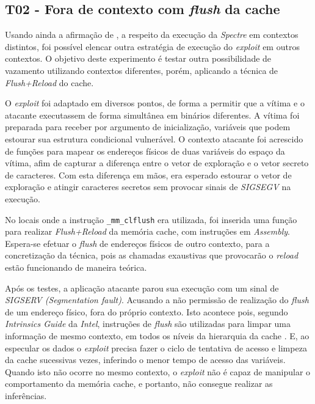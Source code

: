 \documentclass[
	article,			    %
	12pt,				    %
	oneside,			    %
	a4paper,			    %
	chapter=TITLE,		    %
	section=TITLE,		    %
	subsection=TITLE,	    %
	english,			    %
	brazil,				    %
	sumario=tradicional
]{abntex2}
\begin{document}
\subsection{T02 - Fora de contexto com \emph{flush} da cache}
Usando ainda a afirmação de , a respeito da execução da \emph{Spectre} em contextos distintos, foi possível elencar outra estratégia de execução do \emph{exploit} em outros contextos. O objetivo deste experimento é testar outra possibilidade de vazamento utilizando contextos diferentes, porém, aplicando a técnica de \emph{Flush+Reload} do cache.

O \emph{exploit} foi adaptado em diversos pontos, de forma a permitir que a vítima e o atacante executassem de forma simultânea em binários diferentes. A vítima foi preparada para receber por argumento de inicialização, variáveis que podem estourar sua estrutura condicional vulnerável. O contexto atacante foi acrescido de funções para mapear os endereços físicos de duas variáveis do espaço da vítima, afim de capturar a diferença entre o vetor de exploração e o vetor secreto de caracteres. Com esta diferença em mãos, era esperado estourar o vetor de exploração e atingir caracteres secretos sem provocar sinais de \emph{SIGSEGV} na execução.

No locais onde a instrução \lstinline[language=C, style=c]{_mm_clflush} era utilizada, foi inserida uma função para realizar \emph{Flush+Reload} da memória cache, com instruções em \emph{Assembly}. Espera-se efetuar o \emph{flush} de endereços físicos de outro contexto, para a concretização da técnica, pois as chamadas exaustivas que provocarão o \emph{reload} estão funcionando de maneira teórica.

Após os testes, a aplicação atacante parou sua execução com um sinal de \emph{SIGSERV (Segmentation fault)}. Acusando a não permissão de realização do \emph{flush} de um endereço físico, fora do próprio contexto. Isto acontece pois, segundo \emph{Intrinsics Guide} da \emph{Intel}, instruções de \emph{flush} são utilizadas para limpar uma informação de mesmo contexto, em todos os níveis da hierarquia da cache \cite{Intel2018Intrinsics}. E, ao especular os dados o \emph{exploit} precisa fazer o ciclo de tentativa de acesso e limpeza da cache sucessivas vezes, inferindo o menor tempo de acesso das variáveis. Quando isto não ocorre no mesmo contexto, o \emph{exploit} não é capaz de manipular o comportamento da memória cache, e portanto, não consegue realizar as inferências.
\end{document}
